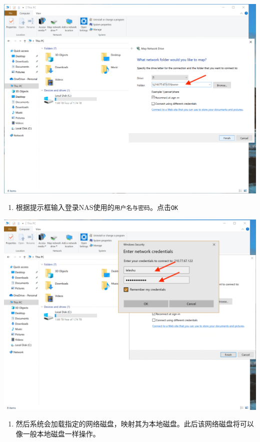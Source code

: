 \documentclass[
]{ctexbook}
\providecommand{\tightlist}{%
  \setlength{\itemsep}{0pt}\setlength{\parskip}{0pt}}
\begin{document}
\begin{itemize}
  \includegraphics{Fig/ch5/win_mapdisk-2.png}

  \begin{enumerate}
  \def\labelenumi{\arabic{enumi}.}
  \tightlist
  \item
    根据提示框输入登录NAS使用的\texttt{用户名与密码}。点击\texttt{OK}
  \end{enumerate}

  \includegraphics{Fig/ch5/win_mapdisk-3.png}

  \begin{enumerate}
  \def\labelenumi{\arabic{enumi}.}
  \tightlist
  \item
    然后系统会加载指定的网络磁盘，映射其为本地磁盘。此后该网络磁盘将可以像一般本地磁盘一样操作。
  \end{enumerate}


\end{itemize}
\end{document}
